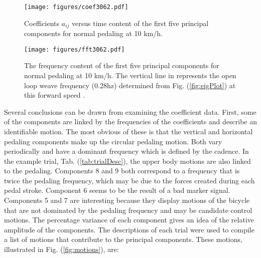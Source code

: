 \begin{figure}[tb]
    \begin{center}
        \texttt{[image: figures/coef3062.pdf]}
    \end{center}
    \caption{Coefficients $a_{ij}$ versus time content of the first five
    principal components for normal pedaling at 10 km/h.}
    \label{fig:coef3062}
\end{figure}
\begin{figure}[tb]
    \begin{center}
        \texttt{[image: figures/fft3062.pdf]}
    \end{center}
    \caption{The frequency
    content of the first five principal components for normal pedaling at 10
    km/h. The vertical line in represents the open loop weave frequency
    (0.28hz) determined from Fig. (\ref{fig:eigPlot}) at this forward speed .}
    \label{fig:fft3062}
\end{figure}
Several conclusions can be drawn from examining the coefficient data. First,
some of the components are linked by the frequencies of the coefficients
and describe an identifiable motion. The most obvious of these is that the vertical
and horizontal pedaling components make up the circular pedaling motion.
Both vary periodically and have a dominant frequency which is defined by the
cadence. In the example trial, Tab. (\ref{tab:trialDesc}), the upper body
motions are also linked to the pedaling. Components 8 and 9 both correspond to
a frequency that is twice the pedaling frequency, which may be due to the
forces created during each pedal stroke. Component 6 seems to be the result of a
bad marker signal. Components 5 and 7 are interesting because they display
motions of the bicycle that are not dominated by the pedaling frequency and may
be candidate control motions. The percentage variance of each component gives
an idea of the relative amplitude of the components. The descriptions of each
trial were used to compile a list of motions that contribute to the principal
components. These motions, illustrated in Fig. (\ref{fig:motions}), are:
